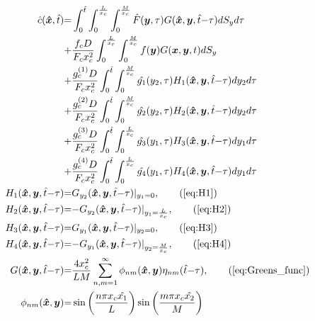 \documentclass[\main/thesis.tex]{subfiles}
\begin{document}
\begin{align}
\hat{c}(\boldsymbol{\hat{x}}, \hat{t}) &{=} \int_{0}^{\hat{t}} \int_{0}^{\frac{L}{x_c}} \int_{0}^{\frac{M}{x_c}} \hat{F}(\boldsymbol{y}, \tau) G(\boldsymbol{\hat{x}}, \boldsymbol{y}, \hat{t}{-}\tau) dS_y d\tau \nonumber\\
               &{+} \frac{f_c D}{F_c x_c^2} \int_{0}^{\frac{L}{x_c}} \int_{0}^{\frac{M}{x_c}} f(\boldsymbol{y}) G(\boldsymbol{x}, \boldsymbol{y}, t) dS_y \nonumber\\
               &{+} \frac{g_c^{(1)} D}{F_c x_c^2} \int_{0}^{\hat{t}} \int_{0}^{\frac{M}{x_c}} \hat{g_1}(y_2, \tau) H_1(\boldsymbol{\hat{x}}, \boldsymbol{y}, \hat{t}{-}\tau) dy_2 d\tau \label{eq:carcin_sol}\\
               &{+} \frac{g_c^{(2)} D}{F_c x_c^2} \int_{0}^{\hat{t}} \int_{0}^{\frac{M}{x_c}} \hat{g_2}(y_2, \tau) H_2(\boldsymbol{\hat{x}}, \boldsymbol{y}, \hat{t}{-}\tau) dy_2 d\tau \nonumber\\
               &{+} \frac{g_c^{(3)} D}{F_c x_c^2} \int_{0}^{\hat{t}} \int_{0}^{\frac{L}{x_c}} \hat{g_3}(y_1, \tau) H_3(\boldsymbol{\hat{x}}, \boldsymbol{y}, \hat{t}{-}\tau) dy_1 d\tau \nonumber\\
               &{+} \frac{g_c^{(4)} D}{F_c x_c^2} \int_{0}^{\hat{t}} \int_{0}^{\frac{L}{x_c}} \hat{g_4}(y_1, \tau) H_4(\boldsymbol{\hat{x}}, \boldsymbol{y}, \hat{t}{-}\tau) dy_1 d\tau \nonumber\\
H_1(\boldsymbol{\hat{x}}, \boldsymbol{y}, \hat{t}{-}\tau) &{=} G_{y_2}(\boldsymbol{\hat{x}}, \boldsymbol{y}, \hat{t}{-}\tau) |_{y_1{=}0}, \tag{\ref{eq:H1}}\\
H_2(\boldsymbol{\hat{x}}, \boldsymbol{y}, \hat{t}{-}\tau) &{=} {-} G_{y_2}(\boldsymbol{\hat{x}}, \boldsymbol{y}, \hat{t}{-}\tau) |_{y_1{=}\frac{L}{x_c}}, \tag{\ref{eq:H2}}\\
H_3(\boldsymbol{\hat{x}}, \boldsymbol{y}, \hat{t}{-}\tau) &{=} G_{y_1}(\boldsymbol{\hat{x}}, \boldsymbol{y}, \hat{t}{-}\tau) |_{y_2{=}0}, \tag{\ref{eq:H3}}\\
H_4(\boldsymbol{\hat{x}}, \boldsymbol{y}, \hat{t}{-}\tau) &{=} {-} G_{y_1}(\boldsymbol{\hat{x}}, \boldsymbol{y}, \hat{t}{-}\tau) |_{y_2{=}\frac{M}{x_c}}, \tag{\ref{eq:H4}}\\
G(\boldsymbol{\hat{x}}, \boldsymbol{y}, \hat{t}{-}\tau) &{=} \frac{4 x_c^2}{LM} \sum_{n, m {=} 1}^{\infty} \phi_{nm}(\boldsymbol{\hat{x}}, \boldsymbol{y}) \eta_{nm}(\hat{t}{-}\tau), \tag{\ref{eq:Greens_func}}\\
\phi_{nm}(\boldsymbol{\hat{x}}, \boldsymbol{y}) &{=} \sin\left(\frac{n \pi x_c \hat{x_1}}{L}\right)\sin\left(\frac{m \pi x_c \hat{x_2}}{M}\right)

\end{align}
\end{document}
